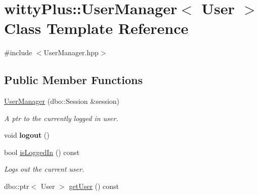 \hypertarget{classwittyPlus_1_1UserManager}{
\section{wittyPlus::UserManager$<$ User $>$ Class Template Reference}
\label{classwittyPlus_1_1UserManager}
}


{\ttfamily \#include $<$UserManager.hpp$>$}

\subsection*{Public Member Functions}
\begin{DoxyCompactItemize}
\item 
\hypertarget{classwittyPlus_1_1UserManager_a147064c05eaaff24d8f981d7fdada4b2}{
\hyperlink{classwittyPlus_1_1UserManager_a147064c05eaaff24d8f981d7fdada4b2}{UserManager} (dbo::Session \&session)}
\label{classwittyPlus_1_1UserManager_a147064c05eaaff24d8f981d7fdada4b2}

\begin{DoxyCompactList}\small\item\em A ptr to the currently logged in user. \item\end{DoxyCompactList}\item 
\hypertarget{classwittyPlus_1_1UserManager_ab5150a19f751e6ee66bef3a0afaca02c}{
void {\bfseries logout} ()}
\label{classwittyPlus_1_1UserManager_ab5150a19f751e6ee66bef3a0afaca02c}

\item 
\hypertarget{classwittyPlus_1_1UserManager_a882c9d9dc1f8fc2b0b9f9d096541c254}{
bool \hyperlink{classwittyPlus_1_1UserManager_a882c9d9dc1f8fc2b0b9f9d096541c254}{isLoggedIn} () const }
\label{classwittyPlus_1_1UserManager_a882c9d9dc1f8fc2b0b9f9d096541c254}

\begin{DoxyCompactList}\small\item\em Logs out the current user. \item\end{DoxyCompactList}\item 
\hypertarget{classwittyPlus_1_1UserManager_a0d0162db5fc0ba80719c95c6301a79c5}{
dbo::ptr$<$ User $>$ \hyperlink{classwittyPlus_1_1UserManager_a0d0162db5fc0ba80719c95c6301a79c5}{getUser} () const }
\label{classwittyPlus_1_1UserManager_a0d0162db5fc0ba80719c95c6301a79c5}


\end{DoxyCompactItemize}
